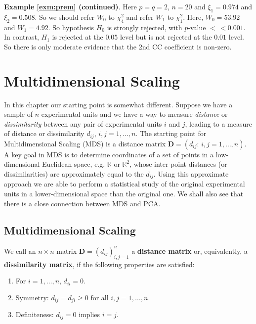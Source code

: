 \documentclass[]{book}
\providecommand{\tightlist}{%
  \setlength{\itemsep}{0pt}\setlength{\parskip}{0pt}}
\theoremstyle{definition}
\theoremstyle{definition}
\theoremstyle{definition}
\theoremstyle{remark}
\begin{document}
\textbf{Example \ref{exm:prem} (continued)}.
Here \(p=q=2\), \(n=20\) and \(\xi_1=0.974\) and \(\xi_2=0.508\).
So we should refer \(W_0\) to \(\chi_4^2\) and refer \(W_1\) to \(\chi_1^2\). Here, \(W_0=53.92\) and \(W_1=4.92\). So hypothesis \(H_0\) is strongly rejected, with \(p\)-value \(<\,<0.001\). In contrast, \(H_1\) is rejected at the \(0.05\) level but is not rejected at the \(0.01\) level. So there is only moderate evidence that the 2nd CC coefficient is non-zero.

\hypertarget{mds}{%
\chapter{Multidimensional Scaling}\label{mds}}

In this chapter our starting point is somewhat different. Suppose we have a sample of \(n\) experimental units
and we have a way to measure \emph{distance} or \emph{dissimilarity} between any pair of experimental units \(i\) and \(j\), leading to a measure of distance or dissimilarity \(d_{ij}\), \(i,j=1, \ldots , n\). The starting point for Multidimensional Scaling (MDS) is a distance matrix \(\boldsymbol D=(d_{ij}: \, i,j=1, \ldots , n)\). A key goal in MDS is to determine coordinates of a set of points in a low-dimensional Euclidean space, e.g. \(\mathbb{R}\) or \(\mathbb{R}^2\), whose inter-point distances (or dissimilarities) are approximately equal to the \(d_{ij}\). Using this approximate approach we are able to perform a statistical study of the original experimental units in a lower-dimensional space than the original one. We shall also see that there is a close connection between MDS and PCA.

\hypertarget{multidimensional-scaling}{%
\section{Multidimensional Scaling}\label{multidimensional-scaling}}

We call an \(n \times n\) matrix \(\boldsymbol D=(d_{ij})_{i,j=1}^n\) a \textbf{distance matrix} or, equivalently, a \textbf{dissimilarity matrix}, if the following properties are satisfied:

\begin{enumerate}
\def\labelenumi{\arabic{enumi}.}
\tightlist
\item
  For \(i=1, \ldots , n\), \(d_{ii}=0\).
\item
  Symmetry: \(d_{ij}=d_{ji} \geq 0\) for all \(i,j=1,\ldots, n\).
\item
  Definiteness: \(d_{ij}=0\) implies \(i=j\).
\end{enumerate}
\end{document}
